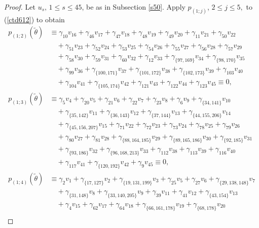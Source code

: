 \documentclass[reqno]{amsart}
\theoremstyle{plain}
\theoremstyle{definition}
\theoremstyle{plain}
\theoremstyle{definition}
\numberwithin{equation}{section}
\begin{document}
\begin{proof}
Let $u_s,\, 1\leqslant s \leqslant 45$, be as in Subsection \ref{s50}. Apply $p_{(1;j)}$, $2 \leqslant j \leqslant 5,$ to (\ref{ctd612}) to obtain
\begin{align*}
p_{(1;2)}(\widetilde\theta) &\equiv \gamma_{10}v_{16} + \gamma_{46}v_{17} + \gamma_{47}v_{18} + \gamma_{48}v_{19} + \gamma_{49}v_{20} + \gamma_{11}v_{21} + \gamma_{50}v_{22}\\ 
&\quad + \gamma_{51}v_{23} + \gamma_{52}v_{24} + \gamma_{53}v_{25} + \gamma_{54}v_{26} + \gamma_{55}v_{27} + \gamma_{56}v_{28} + \gamma_{57}v_{29}\\ 
&\quad + \gamma_{58}v_{30} + \gamma_{59}v_{31} + \gamma_{60}v_{32} + \gamma_{12}v_{33} + \gamma_{\{97,169\}}v_{34} + \gamma_{\{98,170\}}v_{35}\\ 
&\quad + \gamma_{99}v_{36} + \gamma_{\{100,171\}}v_{37} + \gamma_{\{101,172\}}v_{38} + \gamma_{\{102,173\}}v_{39} + \gamma_{103}v_{40}\\ 
&\quad + \gamma_{104}v_{41} + \gamma_{\{105,174\}}v_{42} + \gamma_{121}v_{43} + \gamma_{122}v_{44} + \gamma_{123}v_{45} \equiv 0,\\ 
p_{(1;3)}(\widetilde\theta) &\equiv \gamma_{5}v_{4} + \gamma_{20}v_{5} + \gamma_{21}v_{6} + \gamma_{22}v_{7} + \gamma_{23}v_{8} + \gamma_{6}v_{9} + \gamma_{\{34,141\}}v_{10}\\ 
&\quad + \gamma_{\{35,142\}}v_{11} + \gamma_{\{36,143\}}v_{12} + \gamma_{\{37,144\}}v_{13} + \gamma_{\{44,155,206\}}v_{14}\\ 
&\quad + \gamma_{\{45,156,207\}}v_{15} + \gamma_{71}v_{22} + \gamma_{72}v_{23} + \gamma_{73}v_{24} + \gamma_{78}v_{25} + \gamma_{79}v_{26}\\ 
&\quad + \gamma_{80}v_{27} + \gamma_{81}v_{28} + \gamma_{\{88,164,185\}}v_{29} + \gamma_{\{89,165,186\}}v_{30} + \gamma_{\{92,185\}}v_{31}\\ 
&\quad + \gamma_{\{93,186\}}v_{32} + \gamma_{\{96,168,213\}}v_{33} + \gamma_{112}v_{38} + \gamma_{113}v_{39} + \gamma_{116}v_{40}\\ 
&\quad + \gamma_{117}v_{41} + \gamma_{\{120,192\}}v_{42} + \gamma_{9}v_{45} \equiv 0,\\
p_{(1;4)}(\widetilde\theta) &\equiv \gamma_{2}v_{1} + \gamma_{\{17,127\}}v_{2} + \gamma_{\{19,131,199\}}v_{3} + \gamma_{25}v_{5} + \gamma_{27}v_{6} + \gamma_{\{29,138,148\}}v_{7}\\ 
&\quad + \gamma_{\{31,148\}}v_{8} + \gamma_{\{33,140,205\}}v_{9} + \gamma_{39}v_{11} + \gamma_{41}v_{12} + \gamma_{\{43,154\}}v_{13}\\ 
&\quad + \gamma_{4}v_{15} + \gamma_{62}v_{17} + \gamma_{64}v_{18} + \gamma_{\{66,161,178\}}v_{19} + \gamma_{\{68,178\}}v_{20}\\ 

\end{align*}
\end{proof}
\end{document}
